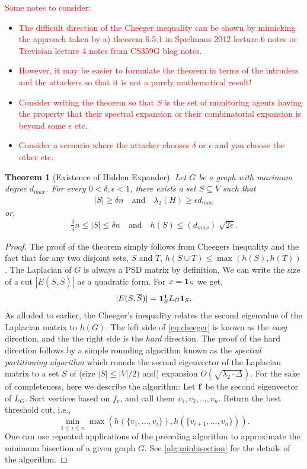 \documentclass{amsart}
\newtheorem{theorem}{Theorem}
\theoremstyle{definition}
\theoremstyle{remark}
\numberwithin{equation}{section}
\def\bone{{\bf 1}}
\def\bof{{\bf f}}
\begin{document}
\medskip
\textcolor{red}{Some notes to consider:}
\begin{itemize}
\item\textcolor{red}{The difficult direction of the Cheeger inequality can be shown by mimicking the approach taken by a) theorem 6.5.1 in Spielmans 2012 lecture 6 notes or Trevisian lecture 4 notes from CS359G blog notes.}
\item\textcolor{red}{However, it may be easier to formulate the theorem in terms of the intruders and the attackers so that it is not a purely mathematical result!}
\item\textcolor{red}{Consider writing the theorem so that $S$ is the set of monitoring agents having the property that their spectral expansion or their combinatorial expansion is beyond some $\epsilon$ etc.}
\item\textcolor{red}{Consider a scenario where the attacker chooses $\delta$ or $\epsilon$ and you choose the other etc.}
\end{itemize}
\begin{theorem}[Existence of Hidden Expander]
Let $G$ be a graph with maximum degree $d_{max}$. For every $0 < \delta,\epsilon < 1$, there exists a set $S \subseteq V$ such that
\begin{align}	
|S| \geq \delta n \quad \text{and} \quad \lambda_2 (H) \geq \epsilon d_{max}
\end{align}
or,
\begin{align}
\frac{\delta}{4}n \leq |S| \leq \delta n \quad \text{and} \quad h(S) \leq (d_{max})\sqrt[]{2 \epsilon}.
\end{align}
\end{theorem}
\begin{proof}
The proof of the theorem simply follows from Cheegers inequality and the fact that for any two disjoint sets, $S$ and $T$, $h(S \cup T) \leq \max{(h(S),h(T))}$. The Laplacian of $G$ is always a PSD matrix by definition. We can write the size of a cut $|E(S,\overline{S})|$ as a quadratic form. For $x=\bone_S$ we get,  
$$
|E(S,\overline{S})|=\bone_S^\intercal L_G \bone_S. 
$$ 
As alluded to earlier, the Cheeger's inequality relates the second eigenvalue of the Laplacian matrix to $h(G)$. The left side of \eqref{eq:cheeger} is known as the \emph{easy} direction, and the the right side is the \emph{hard} direction. The proof of the hard direction follows by a simple rounding algorithm known as the \emph{spectral partitioning algorithm} which rounds the second eigenvector of the Laplacian matrix to a set $S$ of (size $|S|\leq |V|/2)$ and) expansion $O(\sqrt{\lambda_2\cdot \Delta})$. 
For the sake of completeness, here we describe the algorithm:
Let $\bof$ be the second eigenvector of $L_G$. Sort vertices based on $f_v$, and call them $v_1,v_2,\dots,v_n$. Return the best threshold cut, i.e., 
$$ \min_{1\leq i\leq n} \max(h(\{v_1,\dots,v_i\}), h(\{v_{i+1},\dots,v_n\})).$$
One can use repeated applications of the preceding algorithm to approximate the minimum bisection of a given graph $G$. See \autoref{alg:minbisection} for the details of the algorithm. 
\end{proof}
\end{document}
